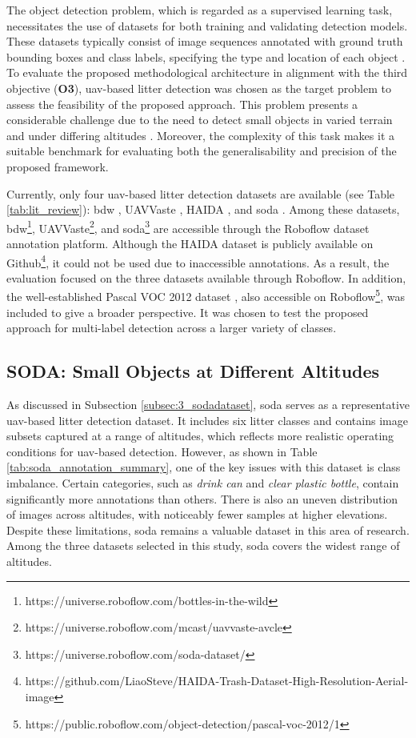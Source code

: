 The object detection problem, which is regarded as a supervised learning task, necessitates the use of datasets for both training and validating detection models. These datasets typically consist of image sequences annotated with ground truth bounding boxes and class labels, specifying the type and location of each object \cite{pascal-voc-2012, coco}.
To evaluate the proposed methodological architecture in alignment with the third objective (\textbf{O3}), \gls{uav}-based litter detection was chosen as the target problem to assess the feasibility of the proposed approach. This problem presents a considerable challenge due to the need to detect small objects in varied terrain and under differing altitudes \cite{soda_dataset}. Moreover, the complexity of this task makes it a suitable benchmark for evaluating both the generalisability and precision of the proposed framework.

Currently, only four \gls{uav}-based litter detection datasets are available (see Table \ref{tab:lit_review}): \gls{bdw} \cite{bdwdataset}, UAVVaste \cite{uavvaste}, HAIDA \cite{haida}, and \gls{soda} \cite{soda_dataset}. Among these datasets, \gls{bdw}\footnote{https://universe.roboflow.com/bottles-in-the-wild}, UAVVaste\footnote{https://universe.roboflow.com/mcast/uavvaste-avcle}, and \gls{soda}\footnote{https://universe.roboflow.com/soda-dataset/} are accessible through the Roboflow dataset annotation platform. Although the HAIDA dataset is publicly available on Github\footnote{https://github.com/LiaoSteve/HAIDA-Trash-Dataset-High-Resolution-Aerial-image}, it could not be used due to inaccessible annotations. As a result, the evaluation focused on the three datasets available through Roboflow. In addition, the well-established Pascal VOC 2012 dataset \cite{pascal-voc-2012}, also accessible on Roboflow\footnote{https://public.roboflow.com/object-detection/pascal-voc-2012/1}, was included to give a broader perspective. It was chosen to test the proposed approach for multi-label detection across a larger variety of classes.


\subsection{SODA: Small Objects at Different Altitudes}
\label{subsec:4_soda}

As discussed in Subsection \ref{subsec:3_sodadataset}, \gls{soda} serves as a representative \gls{uav}-based litter detection dataset. It includes six litter classes and contains image subsets captured at a range of altitudes, which reflects more realistic operating conditions for \gls{uav}-based detection.
However, as shown in Table \ref{tab:soda_annotation_summary}, one of the key issues with this dataset is class imbalance. Certain categories, such as \textit{drink can} and \textit{clear plastic bottle}, contain significantly more annotations than others. There is also an uneven distribution of images across altitudes, with noticeably fewer samples at higher elevations.
Despite these limitations, \gls{soda} remains a valuable dataset in this area of research. Among the three datasets selected in this study, \gls{soda} covers the widest range of altitudes.

